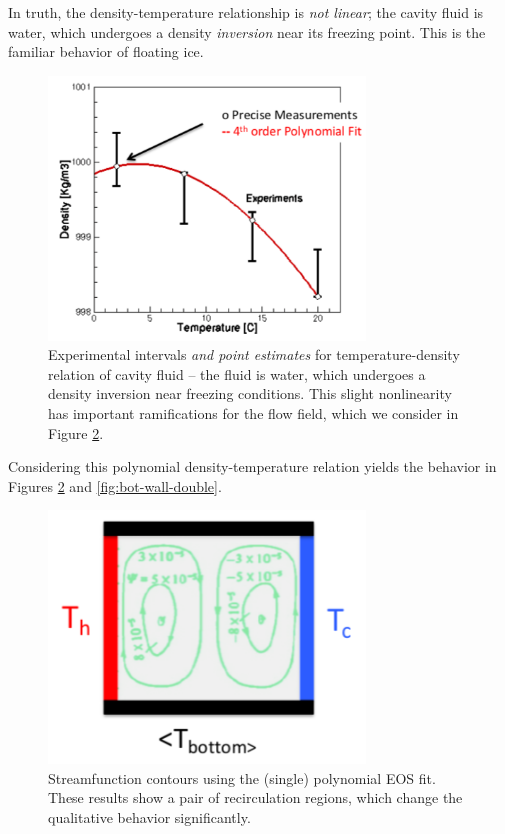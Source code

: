 \documentclass[../primer.tex]{subfiles}
\begin{document}
In truth, the density-temperature relationship is \emph{not linear}; the cavity
fluid is water, which undergoes a density \emph{inversion} near its freezing
point. This is the familiar behavior of floating ice.

\begin{figure}[!ht]
  \includegraphics[width=0.75\textwidth]{./images/density_poly}
  \caption{Experimental intervals \emph{and point estimates} for
    temperature-density relation of cavity fluid -- the fluid is water, which
    undergoes a density inversion near freezing conditions. This slight
    nonlinearity has important ramifications for the flow field, which we
    consider in Figure \ref{fig:cavity-double}.}
  \label{fig:density-poly}
\end{figure}

Considering this polynomial density-temperature relation yields the behavior in
Figures \ref{fig:cavity-double} and \ref{fig:bot-wall-double}.

\begin{figure}[!ht]
  \includegraphics[width=0.75\textwidth]{./images/cavity_double}
  \caption{Streamfunction contours using the (single) polynomial EOS fit. These
    results show a pair of recirculation regions, which change the qualitative
    behavior significantly.}
  \label{fig:cavity-double}
\end{figure}
\end{document}
